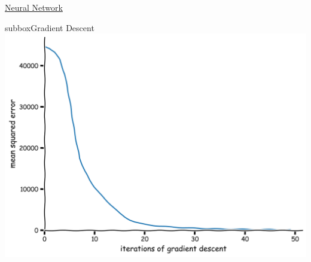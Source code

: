 \begin{textbox}{\href{https://compneuro.neuromatch.io/tutorials/W1D5_DeepLearning/student/W1D5_Tutorial1.html}{Neural Network } }
\begin{subbox}{subbox}{Gradient Descent}
\centering
\includegraphics[scale=0.1]{Figures/DL/DLFigure2.png}
\end{subbox}

\end{textbox}
